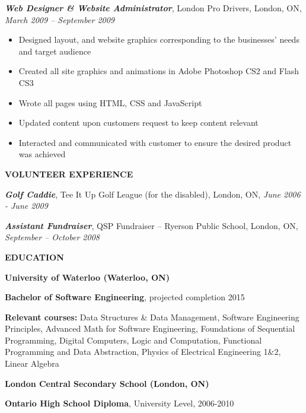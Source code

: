\documentclass[10pt,letterpaper]{article}
\newenvironment{indentedlist}[1]%
{\begin{list}{}%
	{\setlength{\leftmargin}{#1}}%
	\item[]%
}
{\end{list}}
\newcommand{\job}[4]
{
	\emph{\textbf{#1}}, #2, #3, \emph{#4}
}
\newcommand{\education}[4]
{
	\textbf{#1 (#2)}
	
	\textbf{#3}, #4
}
\begin{document}
		\job{Web Designer \& Website Administrator}{London Pro Drivers}{London, ON}{March 2009 -- September 2009}
		
		\begin{indentedlist}{2em}
			\begin{itemize}
				\item Designed layout, and website graphics corresponding to the businesses’ needs and target audience
				\item Created all site graphics and animations in Adobe Photoshop CS2 and Flash CS3
				\item Wrote all pages using HTML, CSS and JavaScript
				\item Updated content upon customers request to keep content relevant
				\item Interacted and communicated with customer to ensure the desired product was achieved
			
			\end{itemize}
		\end{indentedlist}
	
	\textbf{VOLUNTEER EXPERIENCE}
	\vspace{0.5em}
	
	\job{Golf Caddie}{Tee It Up Golf League (for the disabled)}{London, ON}{June 2006 - June 2009}
	
	\vspace{0.5em}
	
	\job{Assistant Fundraiser}{QSP Fundraiser – Ryerson Public School}{London, ON}{September – October 2008}
	
	\vspace{0.5em}
	
	\textbf{EDUCATION}
	
	\vspace{0.5em}
	
	\education{University of Waterloo}{Waterloo, ON}{Bachelor of Software Engineering}{projected completion 2015}
	
	\begin{indentedlist}{2em}
		\textbf{Relevant courses:} Data Structures \& Data Management, Software Engineering Principles, Advanced Math for
		Software Engineering, Foundations of Sequential Programming, Digital Computers, Logic and Computation,
		Functional Programming and Data Abstraction, Physics of Electrical Engineering 1\&2, Linear Algebra
	\end{indentedlist}
	
	\education{London Central Secondary School}{London, ON}{Ontario High School Diploma}{University Level, 2006-2010}
	
\end{document}
